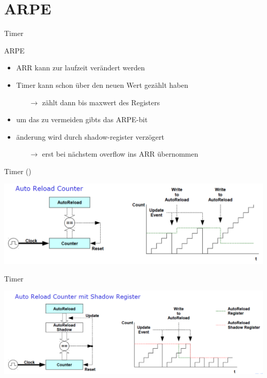   \section{ARPE}
  \begin{frame}{Timer}
    \begin{block} {ARPE}
      \begin{itemize}
        \item ARR kann zur laufzeit verändert werden
        \item Timer kann schon über den neuen Wert gezählt haben
        \begin{itemize}
          \item[$\rightarrow$] zählt dann bis maxwert des Registers
        \end{itemize}
        \item um das zu vermeiden gibts das ARPE-bit
        \item änderung wird durch shadow-register verzögert
        \begin{itemize}
          \item[$\rightarrow$] erst bei nächstem overflow ins ARR übernommen
        \end{itemize}
      \end{itemize}
    \end{block}
  \end{frame}

  \begin{frame}{Timer ()}
    \begin{center}
      \includegraphics[width=\textwidth]{figs/ARPE_disable}    
    \end{center}
  \end{frame}

  \begin{frame}{Timer}
    \begin{center}
      \includegraphics[width=\textwidth]{figs/ARPE_enable}    
    \end{center}
  \end{frame}

